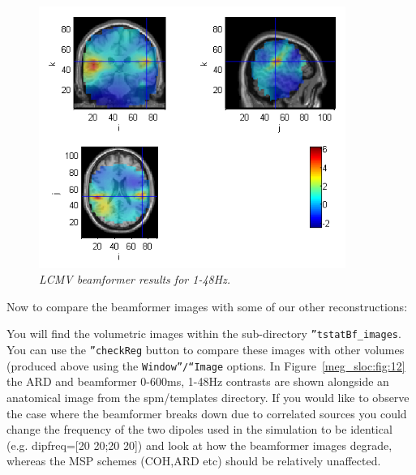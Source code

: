 \begin{figure}
\begin{center}
\includegraphics[width=100mm]{meg_sloc/slide11}
\caption{\em LCMV beamformer results for 1-48Hz.\label{meg_sloc:fig:11}}
\end{center}
\end{figure}

Now to compare the beamformer images with some of our other reconstructions:

You will find the volumetric images within the sub-directory \texttt{''tstatBf\_images}. You can use the \texttt{''checkReg} button to compare these images with other volumes (produced above using the \texttt{Window''/``Image} options. In Figure~\ref{meg_sloc:fig:12} the ARD and beamformer 0-600ms, 1-48Hz contrasts are shown alongside an anatomical image from the spm/templates directory.
If you would like to observe the case where the beamformer breaks down due to correlated sources you could change the frequency of the two dipoles used in the simulation to be identical (e.g. dipfreq=[20 20;20 20]) and look at how the beamformer images  degrade, whereas the MSP schemes (COH,ARD etc) should be relatively unaffected.

